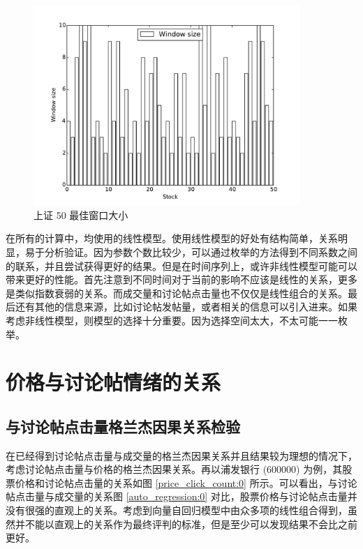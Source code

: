 \begin{figure}
  \centering
  \includegraphics[width=0.9\textwidth]{plots/sliding_ratio_window_selection.pdf}
  \caption{上证 50 最佳窗口大小}
  \label{sliding_window:4}
\end{figure}

在所有的计算中，均使用的线性模型。使用线性模型的好处有结构简单，关系明显，易于分析验证。因为参数个数比较少，可以通过枚举的方法得到不同系数之间的联系，并且尝试获得更好的结果。但是在时间序列上，或许非线性模型可能可以带来更好的性能。首先注意到不同时间对于当前的影响不应该是线性的关系，更多是类似指数衰弱的关系。而成交量和讨论帖点击量也不仅仅是线性组合的关系。最后还有其他的信息来源，比如讨论帖发帖量，或者相关的信息可以引入进来。如果考虑非线性模型，则模型的选择十分重要。因为选择空间太大，不太可能一一枚举。

\chapter{价格与讨论帖情绪的关系}

\section{与讨论帖点击量格兰杰因果关系检验}

在已经得到讨论帖点击量与成交量的格兰杰因果关系并且结果较为理想的情况下，考虑讨论帖点击量与价格的格兰杰因果关系。再以浦发银行 (600000) 为例，其股票价格和讨论帖点击量的关系如图 \ref{price_click_count:0} 所示。可以看出，与讨论帖点击量与成交量的关系图 \ref{auto_regression:0} 对比，股票价格与讨论帖点击量并没有很强的直观上的关系。考虑到向量自回归模型中由众多项的线性组合得到，虽然并不能以直观上的关系作为最终评判的标准，但是至少可以发现结果不会比之前更好。

